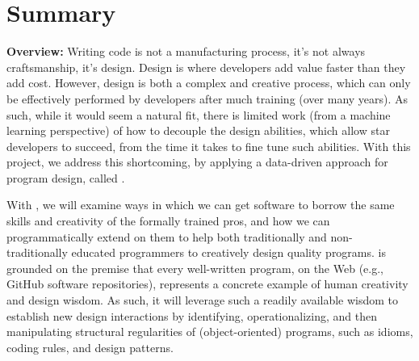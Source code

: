 
\setcounter{section}{1}
\section{Summary \mytitle}

%


{\bf{Overview:}}
%
Writing code is not a manufacturing process, it's not 
always craftsmanship, it's design. Design is where developers add 
value faster than they add cost. However, design is both a complex 
and creative process, which can only be effectively performed by 
developers after much training (over many years). As such, while it 
would seem a natural fit, there is limited work (from a machine learning 
perspective) of how to decouple the design abilities, which allow star 
developers to succeed, from the time it takes to fine tune such abilities. 
With this project, we address this shortcoming, by applying a 
data-driven approach for program design, called \pdm. 

With \pdm, we will examine ways in which we can get software to borrow 
the same skills and creativity of the formally trained pros, and how 
we can programmatically extend on them to help both traditionally and 
non-traditionally educated programmers to creatively design quality programs. 
\pdm is grounded on the premise that every well-written program, on the 
Web (e.g., GitHub software repositories), represents a concrete example 
of human creativity and design wisdom. As such, it will leverage such a 
readily available wisdom to establish new design interactions by  
identifying, operationalizing, and then manipulating structural 
regularities of (object-oriented) programs, such as idioms, coding rules, 
and design patterns.


